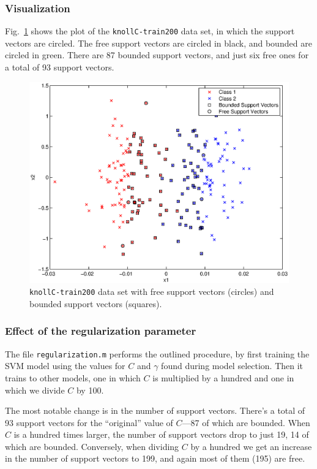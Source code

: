 \documentclass{article}
\begin{document}
\subsubsection{Visualization}

Fig.~\ref{fig:freebounded} shows the plot of the \texttt{knollC-train200} data set, in which the support vectors are circled. The free support vectors are circled in black, and bounded are circled in green. There are 87 bounded support vectors, and just six free ones for a total of 93 support vectors.

\begin{figure}[!ht]
  \centering
  \includegraphics[width=.8\textwidth]{Code/freeBoundedSVs.eps}
  \caption{\texttt{knollC-train200} data set with free support vectors (circles) and bounded support vectors (squares).}
  \label{fig:freebounded}
\end{figure}

\subsubsection{Effect of the regularization parameter}


The file \texttt{regularization.m} performs the outlined procedure, by first training the SVM model using the values for $C$ and $\gamma$ found during model selection. Then it trains to other models, one in which $C$ is multiplied by a hundred and one in which we divide $C$ by 100.

The most notable change is in the number of support vectors. There's a total of 93 support vectors for the ``original'' value of $C$---87 of which are bounded. When $C$ is a hundred times larger, the number of support vectors drop to just 19, 14 of which are bounded. Conversely, when dividing $C$ by a hundred we get an increase in the number of support vectors to 199, and again most of them (195) are free.
\end{document}
